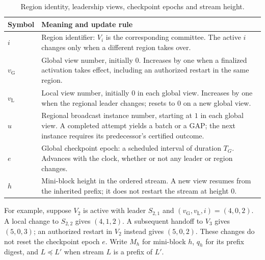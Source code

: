 \documentclass[11pt,a4paper,onecolumn]{article}
\newcommand{\gv}{v_{\mathrm G}}
\newcommand{\lv}{v_{\mathrm L}}
\newcommand{\pre}{\preceq}
\theoremstyle{remark}\newtheorem{example}[definition]{Example}
\begin{document}
\begin{table}[H]\centering\small
\begin{tabularx}{\textwidth}{@{}p{}Y@{}}\toprule
Symbol & Meaning and update rule\\\midrule
$i$ & Region identifier: $V_i$ is the corresponding committee. The active $i$
changes only when a different region takes over.\\
$\gv$ & Global view number, initially $0$. Increases by one when a finalized
activation takes effect, including an authorized restart in the same region.\\
$\lv$ & Local view number, initially $0$ in each global view. Increases by one
when the regional leader changes; resets to $0$ on a new global view.\\
$u$ & Regional broadcast instance number, starting at $1$ in each global view.
A completed attempt yields a batch or a GAP; the next instance requires its
predecessor's certified outcome.\\
$e$ & Global checkpoint epoch: a scheduled interval of duration $T_G$.
Advances with the clock, whether or not any leader or region changes.\\
$h$ & Mini-block height in the ordered stream. A new view resumes from the
inherited prefix; it does not restart the stream at height $0$.\\\bottomrule
\end{tabularx}
\caption{Region identity, leadership views, checkpoint epochs and stream height.}
\end{table}

For example, suppose $V_2$ is active with leader $S_{2,1}$ and
$(\gv,\lv,i)=(4,0,2)$. A local change to $S_{2,2}$ gives $(4,1,2)$.
A subsequent handoff to $V_3$ gives $(5,0,3)$; an authorized restart in $V_2$
instead gives $(5,0,2)$. These changes do not reset the checkpoint epoch $e$.
Write $M_h$ for mini-block $h$, $q_h$ for its prefix digest, and $L\pre L'$
when stream $L$ is a prefix of $L'$.

\end{document}
